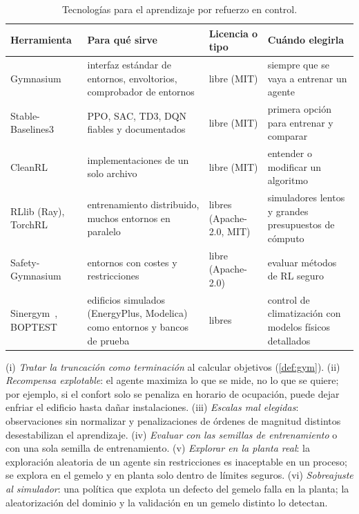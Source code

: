 \begin{table}[htbp]
\centering\footnotesize
\begin{tabularx}{\textwidth}{@{}>{\raggedright\arraybackslash}p{3.1cm}>{\raggedright\arraybackslash}X>{\raggedright\arraybackslash}p{2.0cm}>{\raggedright\arraybackslash}X@{}}
\toprule
Herramienta & Para qué sirve & Licencia o tipo & Cuándo elegirla \\
\midrule
Gymnasium~\cite{gymnasium} & interfaz estándar de entornos, envoltorios, comprobador de entornos & libre (MIT) & siempre que se vaya a entrenar un agente \\
Stable-Baselines3~\cite{sb3} & PPO, SAC, TD3, DQN fiables y documentados & libre (MIT) & primera opción para entrenar y comparar \\
CleanRL & implementaciones de un solo archivo & libre (MIT) & entender o modificar un algoritmo \\
RLlib (Ray), TorchRL & entrenamiento distribuido, muchos entornos en paralelo & libres (Apache-2.0, MIT) & simuladores lentos y grandes presupuestos de cómputo \\
Safety-Gymnasium & entornos con costes y restricciones & libre (Apache-2.0) & evaluar métodos de RL seguro \\
Sinergym~\cite{sinergym}, BOPTEST~\cite{boptest} & edificios simulados (EnergyPlus, Modelica) como entornos y bancos de prueba & libres & control de climatización con modelos físicos detallados \\
\bottomrule
\end{tabularx}
\caption{Tecnologías para el aprendizaje por refuerzo en control.}
\label{tab:tec4}
\end{table}

\begin{observacion}\label{obs:errores4}
(i) \emph{Tratar la truncación como terminación} al calcular objetivos (\cref{def:gym}). (ii) \emph{Recompensa explotable}: el agente maximiza lo que se mide, no lo que se quiere; por ejemplo, si el confort solo se penaliza en horario de ocupación, puede dejar enfriar el edificio hasta dañar instalaciones. (iii) \emph{Escalas mal elegidas}: observaciones sin normalizar y penalizaciones de órdenes de magnitud distintos desestabilizan el aprendizaje. (iv) \emph{Evaluar con las semillas de entrenamiento} o con una sola semilla de entrenamiento. (v) \emph{Explorar en la planta real}: la exploración aleatoria de un agente sin restricciones es inaceptable en un proceso; se explora en el gemelo y en planta solo dentro de límites seguros. (vi) \emph{Sobreajuste al simulador}: una política que explota un defecto del gemelo falla en la planta; la aleatorización del dominio y la validación en un gemelo distinto lo detectan.
\end{observacion}

